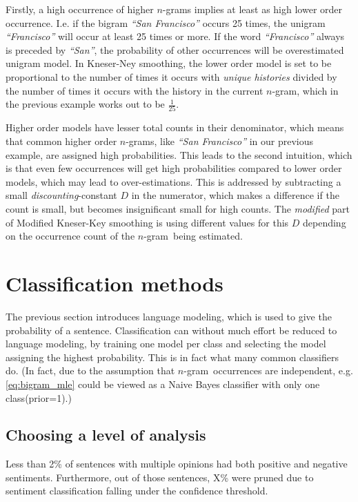 \documentclass[a4paper,11pt]{kth-mag}
\newcommand{\ngram}{$n$-gram}
\begin{document}
Firstly, a high occurrence of higher \ngram s implies at least as high
lower order occurrence. I.e. if the bigram \emph{``San Francisco''} occurs 25 times,
the unigram \emph{``Francisco''} will occur at least 25 times or more.
If the word \emph{``Francisco''} always is preceded by  \emph{``San''},
the probability of other occurrences will be overestimated unigram model.
In Kneser-Ney smoothing, the lower order model is set to be proportional to the
number of times it occurs with \emph{unique histories} divided by the number of times it
occurs with the history in the current \ngram\cite{chen_goodman}, which  in the previous example
works out to be $\frac{1}{25}$.

Higher order models have lesser total counts in their denominator, which means that common
higher order \ngram s, like \emph{``San Francisco''} in our previous example, are assigned high probabilities.
This leads to the second intuition, which is that even few occurrences will
get high probabilities compared to lower order models, which may lead to over-estimations.
This is addressed by subtracting a small \emph{discounting}-constant $D$ in the numerator,
which makes a difference if the count is small, but becomes insignificant small for high counts.
The \emph{modified} part of Modified Kneser-Key smoothing is using different values for this
$D$ depending on the occurrence count of the \ngram~being estimated\cite{chen_goodman}.


\section{Classification methods}
The previous section introduces language modeling, which is used to give the probability of a sentence.
Classification can without much effort be reduced to language modeling, by training one model per class and
selecting the model assigning the highest probability. This is in fact what many common classifiers do.
(In fact, due to the assumption that \ngram~occurrences are independent, e.g. \ref {eq:bigram_mle}
could be viewed as a Naive Bayes classifier with only one class(prior=1).)

\subsection{Choosing a level of analysis}
\label{subsec:sentence_contradictions}
Less than 2\% of sentences with multiple opinions had both positive and negative sentiments.
Furthermore, out of those sentences, X\% were pruned due to sentiment classification falling under the
confidence threshold.
\end{document}
